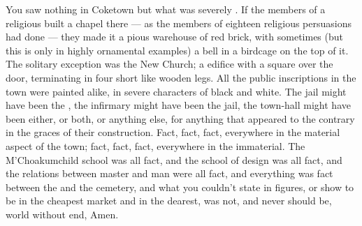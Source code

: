 \documentclass{fiche}
\begin{document}
\begin{texte}
You saw nothing in Coketown but what was severely . If the members of a religious  built a chapel there --- as the members of eighteen religious
persuasions had done --- they made it a pious warehouse of red brick, with sometimes (but
this is only in highly ornamental examples) a bell in a birdcage on the top of it. The
solitary exception was the New Church; a  edifice with
a square  over the door, terminating in four short
 like  wooden
legs. All the public inscriptions in the town were painted alike, in severe characters of
black and white. The jail might have been the , the infirmary might have been the jail, the town-hall might have been
either, or both, or anything else, for anything that appeared to the contrary in the graces
of their construction. Fact, fact, fact, everywhere in the material aspect of the town; fact,
fact, fact, everywhere in the immaterial. The M'Choakumchild school was all fact, and the
school of design was all fact, and the relations between master and man were all fact, and
everything was fact between the 
and the cemetery, and what you couldn't state in figures, or show to be
 in the cheapest market and
 in the dearest, was not, and never should be, world without
end, Amen.
\end{texte}

\end{document}
